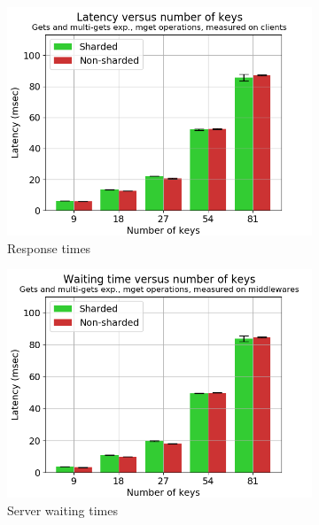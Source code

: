 \documentclass[11pt,a4paper]{article}
\begin{document}
\begin{figure}[h]
\begin{subfigure}{.5\textwidth}
  \centering
  \includegraphics[width=1.0\linewidth ,trim={5px 0px 20px 0px},clip]{img/plot/extra-gmg-mget-lat_cli.png}
  \caption{Response times}
  \label{fig:extra-gmg-mget-lat_cli}
\end{subfigure}%
\begin{subfigure}{.5\textwidth}
  \centering
  \includegraphics[width=1.0\linewidth ,trim={5px 0px 20px 0px},clip]{img/plot/extra-gmg-mget-wtime_mw.png}
  \caption{Server waiting times}
  \label{fig:extra-gmg-mget-wtime_mw}
\end{subfigure}
\begin{subfigure}{.5\textwidth}

\end{subfigure}
\end{figure}
\end{document}
